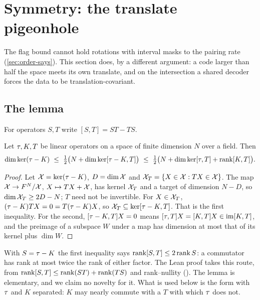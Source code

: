 \section{Symmetry: the translate pigeonhole}\label{sec:symmetry}

The flag bound cannot hold rotations with interval masks to the pairing rate (\cref{sec:order-says}). This section
does, by a different argument: a code larger than half the space meets its own translate, and on the intersection a
shared decoder forces the data to be translation-covariant.

\subsection{The lemma}

For operators $S,T$ write $[S,T]=ST-TS$.

\begin{lemma}\label{lem:pigeonhole}
Let $\tau,K,T$ be linear operators on a space of finite dimension $N$ over a field. Then
\[
  \dim\ker(\sw-K)\ \le\ \tfrac12\bigl(N+\dim\ker[\sw-K,T]\bigr)\ \le\ \tfrac12\bigl(N+\dim\ker[\sw,T]+\rank[K,T]\bigr).
\]
\end{lemma}

\begin{proof}
Let $\mathcal{X}=\ker(\tau-K)$, $D=\dim\mathcal{X}$ and $\mathcal{X}_T=\{X\in\mathcal{X}:TX\in\mathcal{X}\}$. The map $\mathcal{X}\to F^N/\mathcal{X}$, $X\mapsto TX+\mathcal{X}$, has kernel
$\mathcal{X}_T$ and a target of dimension $N-D$, so $\dim\mathcal{X}_T\ge2D-N$; $T$ need not be invertible. For $X\in\mathcal{X}_T$,
$(\tau-K)TX=0=T(\tau-K)X$, so $\mathcal{X}_T\subseteq\ker[\tau-K,T]$. That is the first inequality. For the second, $[\tau-K,T]X=0$
means $[\tau,T]X=[K,T]X\in\operatorname{im}[K,T]$, and the preimage of a subspace $W$ under a map has dimension at most that of its
kernel plus $\dim W$.
\end{proof}

With $S=\tau-K$ the first inequality says $\operatorname{rank}[S,T]\le2\operatorname{rank} S$: a commutator has rank at most twice the rank of
either factor. The Lean proof takes this route, from $\operatorname{rank}[S,T]\le\operatorname{rank}(ST)+\operatorname{rank}(TS)$ and rank--nullity
(). The lemma is elementary, and we claim no novelty for it. What is used below is the form with $\tau$ and $K$ separated: $K$
may nearly commute with a $T$ with which $\tau$ does not.

